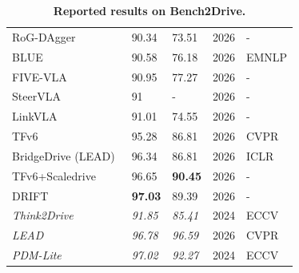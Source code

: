 \documentclass[10pt,twocolumn,letterpaper]{article}
\begin{document}
\begin{table}[t]
\begin{tabular}{l|ll|ll}
RoG-DAgger~\cite{Zhong2026ARXIV} & 90.34 & 73.51 & 2026 & - \\
BLUE~\cite{Ling2026EMNLP} & 90.58 & 76.18 & 2026 & EMNLP \\
FIVE-VLA~\cite{Oksuz2026ARXIV} & 90.95 & 77.27  & 2026 & - \\
SteerVLA~\cite{Gao2026ARXIV} & 91 & - & 2026 & - \\
LinkVLA~\cite{Wang2026ARXIV} & 91.01 & 74.55 & 2026 & - \\
TFv6~\cite{Nguyen2026CVPR} & 95.28 & 86.81 & 2026 & CVPR \\
BridgeDrive (LEAD)~\cite{Liu2026ICLR} & 96.34 & 86.81 & 2026 & ICLR \\
TFv6+Scaledrive~\cite{Gui2026ARXIV} & 96.65 & \textbf{90.45} & 2026 & - \\
DRIFT~\cite{Aghajanzadeh2026ARXIV} & \textbf{97.03} & {89.39} & 2026 & - \\
\midrule
\textit{Think2Drive}~\cite{Li2024ECCV} & \textit{91.85} & \textit{85.41} & 2024 & ECCV \\
\textit{LEAD}~\cite{Nguyen2026CVPR} & \textit{96.78} & \textit{96.59} & 2026 & CVPR \\
\textit{PDM-Lite}~\cite{Sima2024ECCV} & \textit{97.02} & \textit{92.27} & 2024 & ECCV \\
\bottomrule
\end{tabular}
\caption{\textbf{Reported results on Bench2Drive.}}
\label{tab:b2d}
\end{table}


\clearpage


{
    \small
    
    
}
\end{document}
